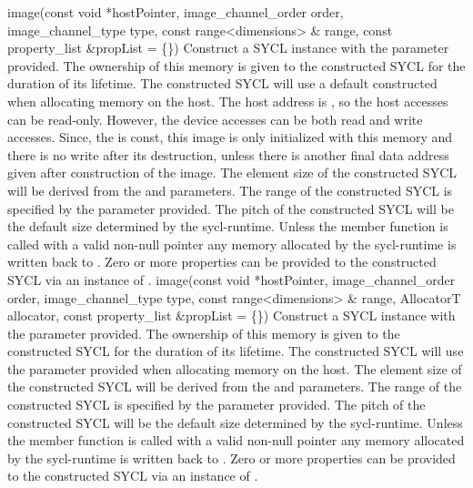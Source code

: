     \addRowFiveSL
      {image(const void *hostPointer, }
      { image_channel_order order, }
      { image_channel_type type, }
      { const range<dimensions> \& range, }
      { const property_list \&propList = \{\}) }
      {
         Construct a SYCL  instance with the  parameter provided. The ownership of this memory is given to the constructed SYCL  for the duration of its lifetime.
         The constructed SYCL  will use a default constructed  when allocating memory on the host.
         The host address is , so the host accesses can be read-only. However, the device accesses can be both read and write accesses. Since, the  is const, this image is only initialized with this memory and there is no write after its destruction, unless there is another final data address given after construction of the image.
         The element size of the constructed SYCL  will be derived from the  and  parameters.
         The range of the constructed SYCL  is specified by the  parameter provided.
         The pitch of the constructed SYCL  will be the default size determined by the \gls{sycl-runtime}.
         Unless the member function  is called with a valid non-null pointer any memory allocated by the \gls{sycl-runtime} is written back to .
         Zero or more properties can be provided to the constructed SYCL  via an instance of .
    }
    \addRowSixSL
      {image(const void *hostPointer, }
      { image_channel_order order, }
      { image_channel_type type, }
      { const range<dimensions> \& range, }
      { AllocatorT allocator, }
      { const property_list \&propList = \{\}) }
      {
         Construct a SYCL  instance with the  parameter provided. The ownership of this memory is given to the constructed SYCL  for the duration of its lifetime.       
         The constructed SYCL  will use the  parameter provided when allocating memory on the host.
         The element size of the constructed SYCL  will be derived from the  and  parameters.
         The range of the constructed SYCL  is specified by the  parameter provided.
         The pitch of the constructed SYCL  will be the default size determined by the \gls{sycl-runtime}.
         Unless the member function  is called with a valid non-null pointer any memory allocated by the \gls{sycl-runtime} is written back to .
         Zero or more properties can be provided to the constructed SYCL  via an instance of .
      }
